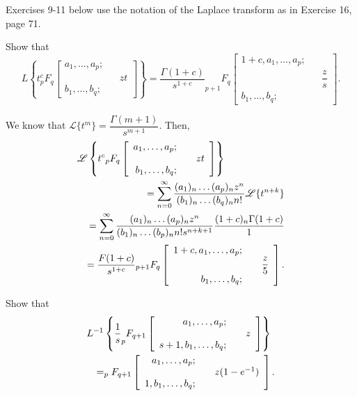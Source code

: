 Exercises 9-11 below use the notation of the Laplace transform as in Exercise 16, page 71.
\begin{problem}\label{problem9chapter5}
Show that
$$L \left\{ t^c _pF_q \left[ \begin{array}{rlr}
a_1, \ldots, a_p; & & \\
& & zt \\
b_1, \ldots, b_q; & &
\end{array} \right] \right\} = \dfrac{\Gamma(1+c)}{s^{1+c}} _{p+1}F_q \left[ \begin{array}{rlr}
1+c,a_1,\ldots,a_p; & & \\
& & \dfrac{z}{s} \\
b_1, \ldots, b_q; & &
\end{array} \right].$$
\end{problem}
\begin{solution}
We know that $\mathscr{L} \{ t^m \} = \dfrac{\Gamma(m+1)}{s^{m+1}}.$ Then,
\begin{eqnarray*}
\lefteqn{\mathscr{L} \left\{ t^c {}_pF_q \left[ \begin{array}{rlr}
a_1, \ldots, a_p; & & \\
& & zt \\
b_1, \ldots, b_q; & & 
\end{array} \right] \right\}} \\
& &= \displaystyle\sum_{n=0}^{\infty} \dfrac{(a_1)_n \ldots (a_p)_n z^n}{(b_1)_n \ldots (b_q)_n n!} \mathscr{L} \{t^{n+k} \} \\
&&= \displaystyle\sum_{n=0}^{\infty} \dfrac{(a_1)_n \ldots (a_p)_n z^n}{(b_1)_n \ldots (b_p)_n n! s^{n+k+1}} \dfrac{(1+c)_n \Gamma(1+c)}{1} \\
&&= \dfrac{F(1+c)}{s^{1+c}} {}_{p+1}F_q \left[ \begin{array}{rlr}
1+c, a_1, \ldots, a_p; & & \\
& & \dfrac{z}{5} \\
b_1, \ldots, b_q; & &
\end{array} \right].
\end{eqnarray*}
\end{solution}
\begin{problem}\label{problem10chapter5}
Show that
\begin{eqnarray*}
\lefteqn{L^{-1} \left\{ \dfrac{1}{s} _pF_{q+1} \left[ \begin{array}{rlr}
a_1,\ldots,a_p; & & \\
& & z \\
s+1,b_1,\ldots,b_q; & &
\end{array} \right] \right\}} \\
& & = _pF_{q+1} \left[ \begin{array}{rlr}
a_1,\ldots,a_p; & & \\
& & z(1-e^{-1}) \\
1, b_1, \ldots, b_q; & & 
\end{array} \right].
\end{eqnarray*}
\end{problem}
